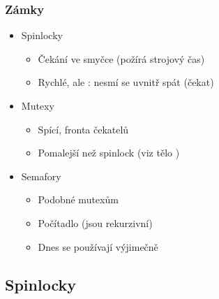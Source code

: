 \begin{frame}
  \frametitle{Zámky}

  \begin{itemize}
    \item Spinlocky
    \begin{itemize}
      \item Čekání ve smyčce (požírá strojový čas)
      \item Rychlé, ale \pozor: nesmí se uvnitř spát (čekat)
    \end{itemize}

    \pause

    \item Mutexy
    \begin{itemize}
      \item Spící, fronta čekatelů
      \item Pomalejší než spinlock (viz tělo )
    \end{itemize}

    \pause

    \item Semafory
    \begin{itemize}
      \item Podobné mutexům
      \item Počítadlo (jsou rekurzivní)
      \item Dnes se používají výjimečně
    \end{itemize}
  \end{itemize}

  \medskip
  \pause

  \begin{center}
  \end{center}
\end{frame}

\iffimuni
\subsection{Spinlocky}
\fi

